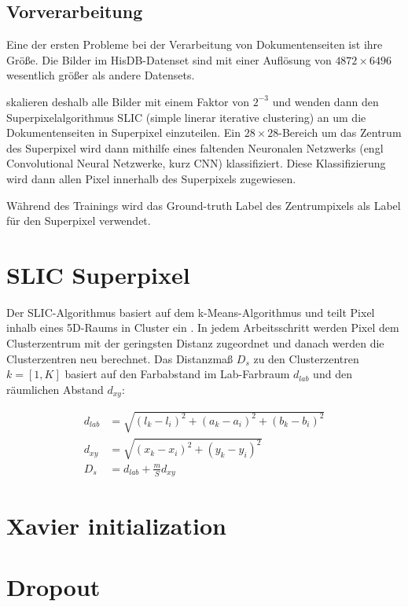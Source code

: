 \subsection{Vorverarbeitung}
Eine der ersten Probleme bei der Verarbeitung von Dokumentenseiten ist ihre Größe.
Die Bilder im HisDB-Datenset sind mit einer Auflösung von \(4872 \times 6496\) wesentlich größer als andere Datensets.

\citeauthor{ChenConvolutionalNeuralNetworks2017} skalieren deshalb alle Bilder mit einem Faktor von  \(2^{-3}\) und wenden dann den Superpixelalgorithmus SLIC (simple linerar iterative clustering) an
\autocite{AchantaSLICSuperpixels2010} um die Dokumentenseiten in Superpixel einzuteilen.
Ein \(28 \times 28\)-Bereich um das Zentrum des Superpixel wird dann mithilfe eines faltenden Neuronalen Netzwerks (engl Convolutional Neural Netzwerke, kurz CNN)
klassifiziert. Diese Klassifizierung wird dann allen Pixel innerhalb des Superpixels zugewiesen.

Während des Trainings wird das Ground-truth Label des Zentrumpixels als Label für den Superpixel verwendet.

\section{SLIC Superpixel}
Der SLIC-Algorithmus basiert auf dem k-Means-Algorithmus und teilt Pixel inhalb eines 5D-Raums in Cluster ein \autocite{AchantaSLICSuperpixels2010}. 
In jedem Arbeitsschritt werden Pixel dem Clusterzentrum mit der geringsten Distanz zugeordnet und danach werden die Clusterzentren neu berechnet.
Das Distanzmaß \(D_s\) zu den Clusterzentren \(k=[1,K]\) basiert auf den Farbabstand im Lab-Farbraum \(d_{lab}\) und den räumlichen Abstand \(d_{xy}\):

\begin{align}
    d_{lab} &= \sqrt{ \left( l_k - l_i \right)^2 + \left( a_k - a_i \right)^2 + \left( b_k - b_i \right)^2 }\\
    d_{xy}  &= \sqrt{ \left( x_k - x_i \right)^2 + \left(y_k - y_i \right)^2 }\\
    D_{s}   &= d_{lab} + \frac{m}{S} d_{xy}
\end{align}




\section{Xavier initialization}
\section{Dropout}

